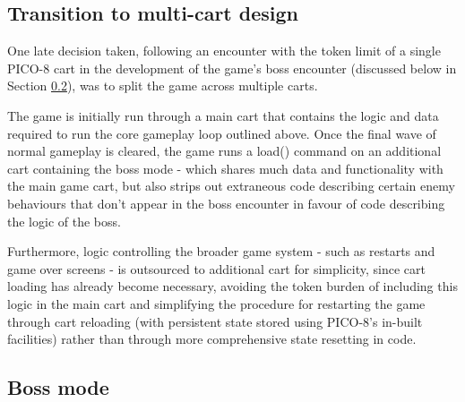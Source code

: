 \documentclass[11pt]{article}
\begin{document}
\subsection{Transition to multi-cart design}\label{multicart}

One late decision taken, following an encounter with the token limit of a single PICO-8 cart
in the development of the game's boss encounter (discussed below in Section \ref{boss}), was to
split the game across multiple carts.

The game is initially run through a main cart that contains the logic and data required to
run the core gameplay loop outlined above. Once the final wave of normal gameplay is cleared,
the game runs a load() command on an additional cart containing the boss mode - which
shares much data and functionality with the main game cart, but also strips out extraneous
code describing certain enemy behaviours that don't appear in the boss encounter in favour of
code describing the logic of the boss.

Furthermore, logic controlling the broader game system - such as restarts and game over screens -
is outsourced to additional cart for simplicity, since cart loading has already become necessary,
avoiding the token burden of including this logic in the main cart and simplifying the procedure
for restarting the game through cart reloading (with persistent state stored using PICO-8's in-built
facilities) rather than through more comprehensive state resetting in code.

\subsection{Boss mode}\label{boss}
\end{document}
